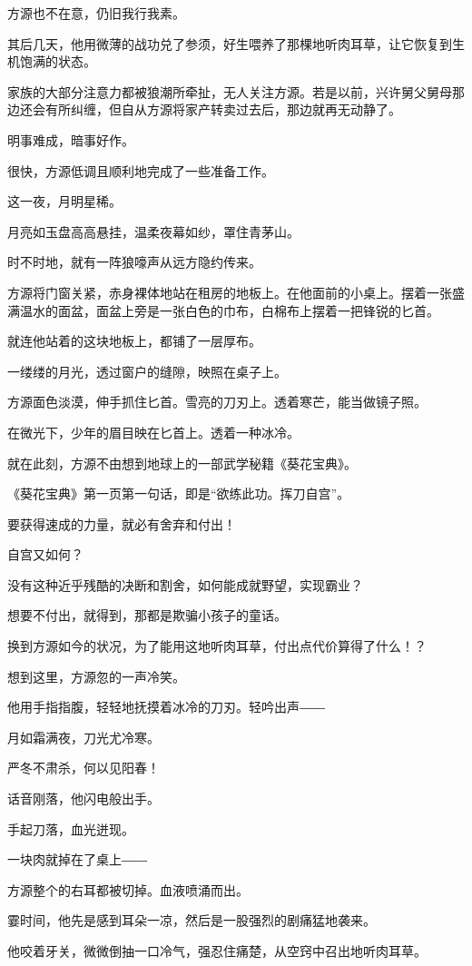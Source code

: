 \begin{this_body}
方源也不在意，仍旧我行我素。

其后几天，他用微薄的战功兑了参须，好生喂养了那棵地听肉耳草，让它恢复到生机饱满的状态。

家族的大部分注意力都被狼潮所牵扯，无人关注方源。若是以前，兴许舅父舅母那边还会有所纠缠，但自从方源将家产转卖过去后，那边就再无动静了。

明事难成，暗事好作。

很快，方源低调且顺利地完成了一些准备工作。

这一夜，月明星稀。

月亮如玉盘高高悬挂，温柔夜幕如纱，罩住青茅山。

时不时地，就有一阵狼嚎声从远方隐约传来。

方源将门窗关紧，赤身裸体地站在租房的地板上。在他面前的小桌上。摆着一张盛满温水的面盆，面盆上旁是一张白色的巾布，白棉布上摆着一把锋锐的匕首。

就连他站着的这块地板上，都铺了一层厚布。

一缕缕的月光，透过窗户的缝隙，映照在桌子上。

方源面色淡漠，伸手抓住匕首。雪亮的刀刃上。透着寒芒，能当做镜子照。

在微光下，少年的眉目映在匕首上。透着一种冰冷。

就在此刻，方源不由想到地球上的一部武学秘籍《葵花宝典》。

《葵花宝典》第一页第一句话，即是“欲练此功。挥刀自宫”。

要获得速成的力量，就必有舍弃和付出！

自宫又如何？

没有这种近乎残酷的决断和割舍，如何能成就野望，实现霸业？

想要不付出，就得到，那都是欺骗小孩子的童话。

换到方源如今的状况，为了能用这地听肉耳草，付出点代价算得了什么！？

想到这里，方源忽的一声冷笑。

他用手指指腹，轻轻地抚摸着冰冷的刀刃。轻吟出声――

月如霜满夜，刀光尤冷寒。

严冬不肃杀，何以见阳春！

话音刚落，他闪电般出手。

手起刀落，血光迸现。

一块肉就掉在了桌上――

方源整个的右耳都被切掉。血液喷涌而出。

霎时间，他先是感到耳朵一凉，然后是一股强烈的剧痛猛地袭来。

他咬着牙关，微微倒抽一口冷气，强忍住痛楚，从空窍中召出地听肉耳草。


\end{this_body}

